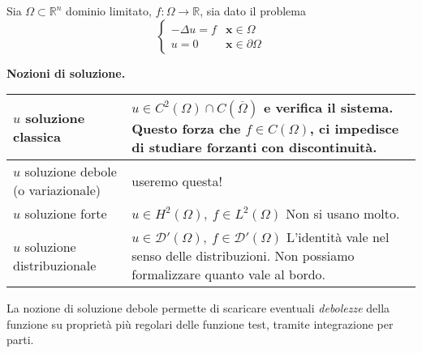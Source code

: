 \documentclass[10pt,a4paper,twoside,openright]{book}
\newcommand{\x}{\mathbf{x}}
\begin{document}
Sia $\displaystyle \Omega \subset \mathbb{R}^{n}$ dominio limitato, $\displaystyle f:\Omega \rightarrow \mathbb{R}$, sia dato il problema
\begin{equation}
	\begin{cases}
		-\Delta u=f & \x \in \Omega          \\
		u=0         & \x \in \partial \Omega 
	\end{cases}
	\label{eq:af-problema-poisson}
\end{equation}
\vspace*{0.5cm}
\begin{center}
	\textbf{Nozioni di soluzione.}
\end{center}
\begin{center}
	{\renewcommand{\arraystretch}{2.8}%
	\begin{tabular}{|l|l|}
		\hline 
		$u$ soluzione classica                               & \makecell[l]{$\displaystyle u\in C^{2}( \Omega ) \cap C(\overline{\Omega })$ e verifica il sistema. \\Questo forza che $\displaystyle f\in C( \Omega )$, ci impedisce di studiare\\forzanti con discontinuità.} \\
		\hline 
		\makecell[l]{$u$ soluzione debole\\(o variazionale)} & useremo questa! \\
		\hline 
		$u$ soluzione forte                                  & \makecell[l]{$\displaystyle u\in H^{2}( \Omega ) ,\ f\in L^{2}( \Omega )$                           \\Non si usano molto.} \\
		\hline 
		$u$ soluzione distribuzionale                        & \makecell[l]{$\displaystyle u\in \mathcal{D} '( \Omega ) ,\ f\in \mathcal{D} '( \Omega )$           \\L'identità vale nel senso delle distribuzioni.\\Non possiamo formalizzare quanto vale al bordo.} \\
		\hline
	\end{tabular}
	}
\end{center}
\vspace*{0.5cm}
La nozione di soluzione debole permette di scaricare eventuali \textit{debolezze} della funzione su proprietà più regolari delle funzione test, tramite integrazione per parti. 
\end{document}
